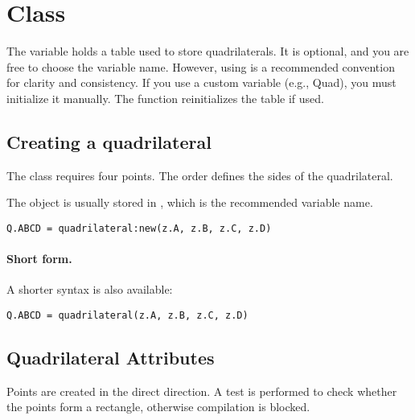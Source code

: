 \newpage
\section{Class }

\vspace{1em}
The variable  holds a table used to store quadrilaterals. It is optional, and you are free to choose the variable name. However, using  is a recommended convention for clarity and consistency. If you use a custom variable (e.g., Quad), you must initialize it manually. The  function reinitializes the  table if used.


\subsection{Creating a quadrilateral}
\label{sub:creating_a_quadrilateral}
The  class requires four points. The order defines the sides of the quadrilateral.

\medskip
The object is usually stored in , which is the recommended variable name.

\begin{mybox}
\begin{verbatim}
Q.ABCD = quadrilateral:new(z.A, z.B, z.C, z.D)
\end{verbatim}
\end{mybox}

\paragraph{Short form.}
A shorter syntax is also available:

\begin{mybox}
\begin{verbatim}
Q.ABCD = quadrilateral(z.A, z.B, z.C, z.D)
\end{verbatim}
\end{mybox}

\subsection{Quadrilateral Attributes}
Points are created in the direct direction. A test is performed to check whether the points form a rectangle, otherwise compilation is blocked.

\begin{center}
\end{center}


